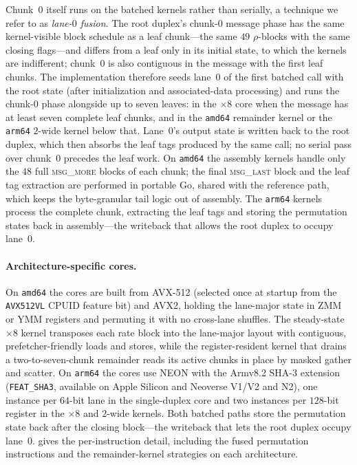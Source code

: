 Chunk~$0$ itself runs on the batched kernels rather than serially, a technique
we refer to as \emph{lane-$0$ fusion}. The root duplex's chunk-$0$ message
phase has the same kernel-visible block schedule as a leaf chunk---the same
$49$ $\rho$-blocks with the same closing flags---and differs from a leaf only
in its initial state, to which the kernels are indifferent; chunk~$0$ is also
contiguous in the message with the first leaf chunks. The implementation
therefore seeds lane~$0$ of the first batched call with the root state (after
initialization and associated-data processing) and runs the chunk-$0$ phase
alongside up to seven leaves: in the $\times 8$ core when the message has at
least seven complete leaf chunks, and in the \texttt{amd64} remainder kernel or
the \texttt{arm64} $2$-wide kernel below that. Lane~$0$'s output state is
written back to the root duplex, which then absorbs the leaf tags produced by
the same call; no serial pass over chunk~$0$ precedes the leaf work. On
\texttt{amd64} the assembly kernels handle only the
$48$ full \textsc{msg\_more} blocks of each chunk; the final \textsc{msg\_last}
block and the leaf tag extraction are performed in portable Go, shared with the
reference path, which keeps the byte-granular tail logic out of assembly. The
\texttt{arm64} kernels process the complete chunk, extracting the leaf tags and
storing the permutation states back in assembly---the writeback that allows the
root duplex to occupy lane~$0$.

\paragraph{Architecture-specific cores.}
On \texttt{amd64} the cores are built from AVX-512 (selected once at startup
from the \texttt{AVX512VL} CPUID feature bit) and AVX2, holding the lane-major
state in ZMM or YMM registers and permuting it with no cross-lane shuffles. The
steady-state $\times 8$ kernel transposes each rate block into the lane-major
layout with contiguous, prefetcher-friendly loads and stores, while the
register-resident kernel that drains a two-to-seven-chunk remainder reads its
active chunks in place by masked gather and scatter. On \texttt{arm64} the cores
use NEON with the Armv8.2 SHA-3 extension (\texttt{FEAT\_SHA3}, available on
Apple Silicon and Neoverse V1/V2 and N2), one instance per $64$-bit lane in the
single-duplex core and two instances per $128$-bit register in the $\times 8$
and $2$-wide kernels. Both batched paths store the permutation state back after
the closing block---the writeback that lets the root duplex occupy lane~$0$.
 gives the per-instruction detail, including the fused
permutation instructions and the remainder-kernel strategies on each
architecture.

